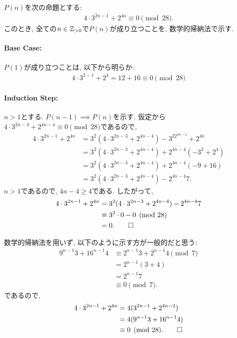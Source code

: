 \begin{proof*}
  $P(n)$を次の命題とする:
  \begin{align*}
    4\cdot 3^{2n-1}+2^{4n}\equiv 0\pmod{28}
    .
  \end{align*}
  このとき,
  全ての$n\in\mathbb{Z}_{>0}$で$P(n)$が成り立つことを,
  数学的帰納法で示す.

  \paragraph{Base Case:}
  $P(1)$が成り立つことは, 以下から明らか:
  \begin{align*}
    4\cdot 3^{2-1}+2^{4}=12+16\equiv 0\pmod{28}
  \end{align*}

  \paragraph{Induction Step:}
  $n>1$とする.
  $P(n-1)\implies P(n)$を示す.
  仮定から$4\cdot 3^{2n-3}+2^{4n-4}\equiv 0\pmod{28}$であるので,
  \begin{align*}
    4\cdot 3^{2n-1}+2^{4n}
    &=3^2(4\cdot 3^{2n-3}+2^{4n-4})
    -3^22^{4n-4}+2^{4n}\\
    &=3^2(4\cdot 3^{2n-3}+2^{4n-4})
    +2^{4n-4}(-3^2+2^{4})\\
    &=3^2(4\cdot 3^{2n-3}+2^{4n-4})
    +2^{4n-4}(-9+16)\\
    &=3^2(4\cdot 3^{2n-3}+2^{4n-4})
    -2^{4n-4}7.
  \end{align*}
  $n>1$であるので, $4n-4\geq 4$である.
  したがって,
  \begin{align*}
    4\cdot 3^{2n-1}+2^{4n}
    &=3^2(4\cdot 3^{2n-3}+2^{4n-4})
    -2^{4n-4}7\\
    &\equiv 3^2\cdot 0-0\pmod{28}\\
    &=0
    .\qedhere
  \end{align*}
\end{proof*}

\begin{rem}
  数学的帰納法を用いず, 以下のように示す方が一般的だと思う:
  \begin{align*}
    9^{n-1}3+16^{n-1}4
    &\equiv 2^{n-1}3+2^{n-1}4 \pmod{7}\\
    &= 2^{n-1}(3+4)\\
    &= 2^{n-1}7\\
    &\equiv 0\pmod{7}.
  \end{align*}
  であるので,
  \begin{align*}
    4\cdot 3^{2n-1}+2^{4n}
    &=4(3^{2n-1}+2^{4n-2})\\
    &=4(9^{n-1}3+16^{n-1}4)\\
    &\equiv 0 \pmod{28}.\qedhere
  \end{align*}
\end{rem}

